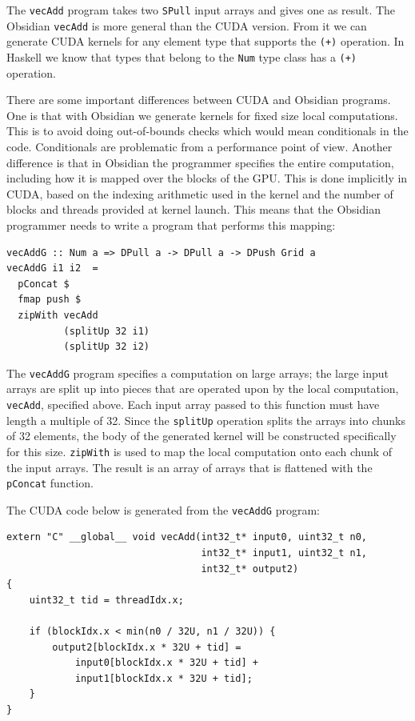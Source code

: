 \documentclass[a4paper]{book}
\begin{document}
\noindent The {\tt vecAdd} program takes two {\tt SPull} input arrays and gives one 
as result. The Obsidian {\tt vecAdd} is more general than the CUDA version. From it 
we can generate CUDA kernels for any element type that supports the {\tt (+)} operation. 
In Haskell we know that types that belong to the {\tt Num} type class has a {\tt (+)} operation.  

There are some important differences between CUDA and Obsidian programs. One is that with Obsidian 
we generate kernels for fixed size local computations. This is to avoid doing out-of-bounds checks 
which would mean conditionals in the code. Conditionals are problematic from a performance 
point of view. Another difference is that in Obsidian the programmer specifies the entire 
computation, including how it is mapped over the blocks of the GPU. This is done implicitly 
in CUDA, based on the indexing arithmetic used in the kernel and the number of blocks and 
threads provided at kernel launch. This means that the Obsidian programmer needs to 
write a program that performs this mapping: 

\begin{small} 
\begin{Verbatim}[samepage=true]
vecAddG :: Num a => DPull a -> DPull a -> DPush Grid a
vecAddG i1 i2  =
  pConcat $
  fmap push $ 
  zipWith vecAdd
          (splitUp 32 i1)
          (splitUp 32 i2)  
\end{Verbatim}
\end{small} 

The {\tt vecAddG} program specifies a computation on large arrays; the large input arrays 
are split up into pieces that are operated upon by the local computation, {\tt vecAdd}, 
specified above. Each input array passed to this function must have length a multiple of 32.
Since the {\tt splitUp} operation splits the arrays into chunks of 32 elements, the body 
of the generated kernel will be constructed specifically for this size. {\tt zipWith} is 
used to map the local computation onto each chunk of the input arrays. The result is an 
array of arrays that is flattened with the {\tt pConcat} function. 

\pagebreak

\noindent The CUDA code below is generated from the {\tt vecAddG} program: 

\begin{small}
\begin{Verbatim}[samepage=true] 
extern "C" __global__ void vecAdd(int32_t* input0, uint32_t n0,
                                  int32_t* input1, uint32_t n1,
                                  int32_t* output2)
{
    uint32_t tid = threadIdx.x;
    
    if (blockIdx.x < min(n0 / 32U, n1 / 32U)) {
        output2[blockIdx.x * 32U + tid] = 
            input0[blockIdx.x * 32U + tid] +
            input1[blockIdx.x * 32U + tid];
    }
}
\end{Verbatim}
\end{small} 
\end{document}
